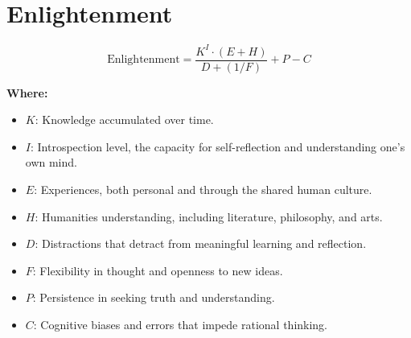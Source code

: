 \chapter{Enlightenment}

\begin{equation}
\text{Enlightenment} = \frac{K^{I} \cdot (E + H)}{D + (1/F)} + P - C
\end{equation}

\textbf{Where:}

\begin{itemize}
    \item $K$: Knowledge accumulated over time.
    \item $I$: Introspection level, the capacity for self-reflection and understanding one's own mind.
    \item $E$: Experiences, both personal and through the shared human culture.
    \item $H$: Humanities understanding, including literature, philosophy, and arts.
    \item $D$: Distractions that detract from meaningful learning and reflection.
    \item $F$: Flexibility in thought and openness to new ideas.
    \item $P$: Persistence in seeking truth and understanding.
    \item $C$: Cognitive biases and errors that impede rational thinking.
\end{itemize}